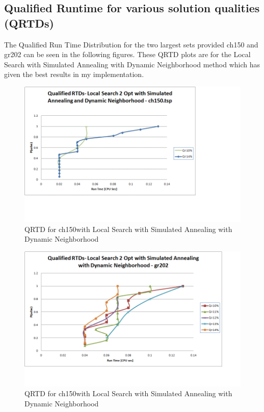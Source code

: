 \documentclass[twoside,11pt]{article}
\begin{document}
\subsection{Qualified Runtime for various solution qualities (QRTDs)}
The Qualified Run Time Distribution for the two largest sets provided ch150 and gr202 can be seen in the following figures. These QRTD plots are for the Local Search with Simulated Annealing with Dynamic Neighborhood method which has given the best results in my implementation.
\begin{figure}[!htbp]
\centering
\caption{QRTD for ch150with Local Search with Simulated Annealing with Dynamic Neighborhood}
\includegraphics[scale=.85]{images/qrtd_dyn_ch150}
\end{figure}
\begin{figure}[!htbp]
\centering
\caption{QRTD for ch150with Local Search with Simulated Annealing with Dynamic Neighborhood}
\includegraphics[scale=.85]{images/qrtd_dyn_gr202}
\end{figure}
\end{document}
